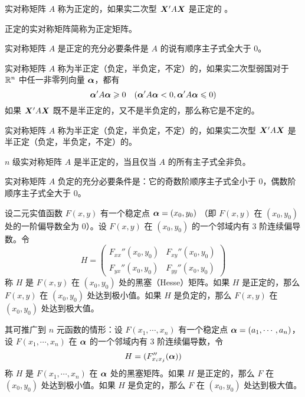 \begin{definition}
    实对称矩阵 $A$ 称为正定的，如果实二次型 $\boldsymbol{X}'A\boldsymbol{X}$ 是正定的 。
\end{definition}

正定的实对称矩阵简称为正定矩阵。

\begin{theorem}
    实对称矩阵 $A$ 是正定的充分必要条件是 $A$ 的说有顺序主子式全大于 $0$。
\end{theorem}

\begin{definition}
    实对称矩阵 $A$ 称为半正定（负定，半负定，不定）的，如果实二次型弱国对于 $\mathbb{R}^n$ 中任一非零列向量 $\boldsymbol{\alpha}$，都有
    $$\boldsymbol{\alpha}'A\boldsymbol{\alpha} \geqslant 0 \quad (\boldsymbol{\alpha}'A\boldsymbol{\alpha}<0,\boldsymbol{\alpha}'A\boldsymbol{\alpha}\leqslant 0)$$
    如果 $\boldsymbol{X}'A\boldsymbol{X}$ 既不是半正定的，又不是半负定的，那么称它是不定的。
\end{definition}

\begin{definition}
    实对称矩阵 $A$ 称为半正定（负定，半负定，不定）的，如果实二次型 $\boldsymbol{X}'A\boldsymbol{X}$ 是半正定（负定，半负定，不定）的。
\end{definition}

\begin{theorem}
    $n$ 级实对称矩阵 $A$ 是半正定的，当且仅当 $A$ 的所有主子式全非负。
\end{theorem}

\begin{theorem}
    实对称矩阵 $A$ 负定的充分必要条件是：它的奇数阶顺序主子式全小于 $0$，偶数阶顺序主子式全大于 $0$。
\end{theorem}

\begin{theorem}
    设二元实值函数 $F(x,y)$ 有一个稳定点 $\boldsymbol{\alpha}=(x_0,y_0)$ （即 $F(x,y)$ 在 $(x_0,y_0)$ 处的一阶偏导数全为 $0$）。设 $F(x,y)$ 在 $(x_0,y_0)$ 的一个邻域内有 3 阶连续偏导数。令
    $$H = \left(\begin{matrix}
        F_{xx}''(x_0,y_0) & F_{xy}''(x_0,y_0)\\
        F_{yx}''(x_0,y_0) & F_{yy}''(x_0,y_0)
    \end{matrix}\right)$$
    称 $H$ 是 $F(x,y)$ 在 $(x_0,y_0)$ 处的黑塞（Hesse）矩阵。如果 $H$ 是正定的，那么 $F(x,y)$ 在 $(x_0,y_0)$ 处达到极小值。如果 $H$ 是负定的，那么 $F(x,y)$ 在 $(x_0,y_0)$ 处达到极大值。
\end{theorem}

其可推广到 $n$ 元函数的情形：设 $F(x_1,\cdots,x_n)$ 有一个稳定点 $\boldsymbol{\alpha} = (a_1,\cdots,a_n)$，设 $F(x_1,\cdots,x_n)$ 在 $\boldsymbol{\alpha}$ 的一个邻域内有 3 阶连续偏导数，令
$$H = (F_{x_ix_j}''(\boldsymbol{\alpha}))$$
称 $H$ 是 $F(x_1,\cdots,x_n)$ 在 $\boldsymbol{\alpha}$ 处的黑塞矩阵。如果 $H$ 是正定的，那么 $F$ 在 $(x_0,y_0)$ 处达到极小值。如果 $H$ 是负定的，那么 $F$ 在 $(x_0,y_0)$ 处达到极大值。